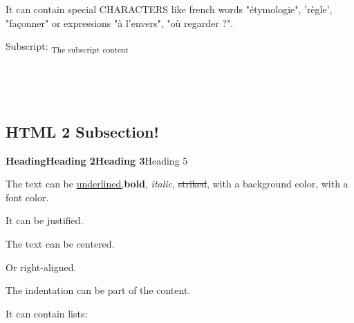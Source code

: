 \documentclass[letter,titlepage,oneside,11pt]{report}%
\begin{document}
\par%
\begin{FlushLeft}%
It can contain special CHARACTERS like french words "étymologie", 'règle', "façonner" or expressions "à l'envers", "où regarder ?".%
\end{FlushLeft}%
\par%
\begin{FlushLeft}%
Subscript: \textsubscript{The subscript content}%
\end{FlushLeft}%
\par%
\begin{FlushLeft}%
\end{FlushLeft}%
\par%
\begin{FlushLeft}%
\end{FlushLeft}%
\subsection{HTML 2 Subsection!}%
\par%
\par%
\begin{FlushLeft}%
{\huge \textbf{Heading}}{\LARGE \textbf{Heading 2}}{\Large \textbf{Heading 3}}{\large Heading 5}%
\end{FlushLeft}%
\par%
\begin{FlushLeft}%
The text can be \underline{underlined,}\textbf{bold}, \textit{italic}, \sout{striked}, with a \colorbox[rgb]{0.8,0.8,0.0}{background color}, with a {\color[rgb]{0.5568627450980392,0.26666666666666666,0.6784313725490196}font color.}%
\end{FlushLeft}%
\par%
\begin{justify}%
It can be justified.%
\end{justify}%
\par%
\begin{Center}%
The text can be centered.%
\end{Center}%
\par%
\begin{FlushRight}%
Or right-aligned.%
\end{FlushRight}%
\par%
\begin{FlushLeft}%
The indentation can be part of the content.%
\end{FlushLeft}%
\par%
\begin{FlushLeft}%
It can contain lists:%
\end{FlushLeft}%
\end{document}
